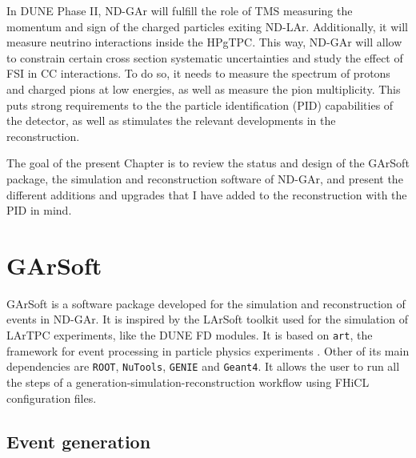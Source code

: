 In DUNE Phase II, ND-GAr will fulfill the role of TMS measuring the momentum and sign of the charged particles exiting ND-LAr. Additionally, it will measure neutrino interactions inside the HPgTPC. This way, ND-GAr will allow to constrain certain cross section systematic uncertainties and study the effect of FSI in CC interactions. To do so, it needs to measure the spectrum of protons and charged pions at low energies, as well as measure the pion multiplicity. This puts strong requirements to the the particle identification (PID) capabilities of the detector, as well as stimulates the relevant developments in the reconstruction.

The goal of the present Chapter is to review the status and design of the GArSoft package, the simulation and reconstruction software of ND-GAr, and present the different additions and upgrades that I have added to the reconstruction with the PID in mind.

\section{GArSoft}\label{section:garsoft}

GArSoft is a software package developed for the simulation and reconstruction of events in ND-GAr. It is inspired by the LArSoft toolkit used for the simulation of LArTPC experiments, like the DUNE FD modules. It is based on \texttt{art}, the framework for event processing in particle physics experiments \cite{ART}. Other of its main dependencies are \texttt{ROOT}, \texttt{NuTools}, \texttt{GENIE} and \texttt{Geant4}. It allows the user to run all the steps of a generation-simulation-reconstruction workflow using FHiCL configuration files.

\subsection{Event generation}


